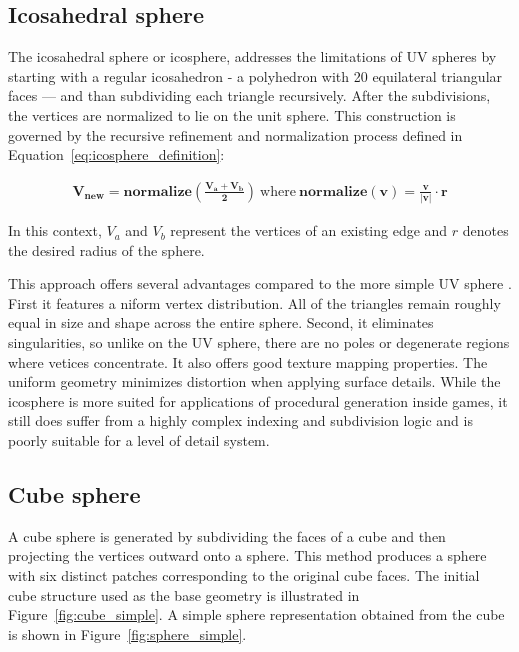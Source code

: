 \documentclass[12pt]{report}
\begin{document}
\subsection{Icosahedral sphere}

The icosahedral sphere or icosphere, addresses the limitations of UV spheres by starting with a regular icosahedron - a polyhedron with 20 equilateral triangular faces — and than subdividing each triangle recursively. After the subdivisions, the vertices are normalized to lie on the unit sphere. This construction is governed by the recursive refinement and normalization process defined in Equation~\ref{eq:icosphere_definition}:

\begin{equation}
\label{eq:icosphere_definition}
\begin{gathered}
\mathbf{V_{new} = \text{normalize}\left(\frac{V_a + V_b}{2}\right)} \
\text{where} \
\mathbf{\text{normalize}(\mathbf{v}) = \frac{\mathbf{v}}{|\mathbf{v}|} \cdot r}
\end{gathered}
\end{equation}

In this context, $V_a$ and $V_b$ represent the vertices of an existing edge and $r$ denotes the desired radius of the sphere.

This approach offers several advantages compared to the more simple UV sphere \cite{doliveira2018,zechmann2025}. First it features a niform vertex distribution. All of the triangles remain roughly equal in size and shape across the entire sphere.
Second, it eliminates singularities, so unlike on the UV sphere, there are no poles or degenerate regions where vetices concentrate. It also offers good texture mapping properties. The uniform geometry minimizes distortion when applying surface details. While the icosphere is more suited for applications of procedural generation inside games, it still does suffer from a highly complex indexing and subdivision logic and is poorly suitable for a level of detail system.

\subsection{Cube sphere}

A cube sphere is generated by subdividing the faces of a cube and then projecting the vertices outward onto a sphere. This method produces a sphere with six distinct patches corresponding to the original cube faces. The initial cube structure used as the base geometry is illustrated in Figure~\ref{fig:cube_simple}. A simple sphere representation obtained from the cube is shown in Figure~\ref{fig:sphere_simple}.
\end{document}

